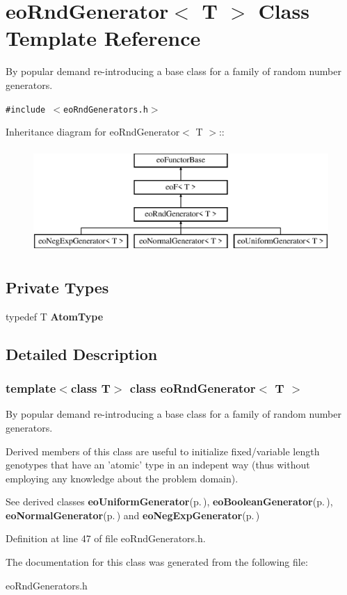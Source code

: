 \section{eo\-Rnd\-Generator$<$ T $>$ Class Template Reference}
\label{classeo_rnd_generator}
By popular demand re-introducing a base class for a family of random number generators.  


{\tt \#include $<$eo\-Rnd\-Generators.h$>$}

Inheritance diagram for eo\-Rnd\-Generator$<$ T $>$::\begin{figure}[H]
\begin{center}
\leavevmode
\includegraphics[height=4cm]{classeo_rnd_generator}
\end{center}
\end{figure}
\subsection*{Private Types}
\begin{CompactItemize}
\item 
typedef T {\bf Atom\-Type}\label{classeo_rnd_generator_y0}

\end{CompactItemize}


\subsection{Detailed Description}
\subsubsection*{template$<$class T$>$ class eo\-Rnd\-Generator$<$ T $>$}

By popular demand re-introducing a base class for a family of random number generators. 

Derived members of this class are useful to initialize fixed/variable length genotypes that have an 'atomic' type in an indepent way (thus without employing any knowledge about the problem domain).

See derived classes {\bf eo\-Uniform\-Generator}{\rm (p.\,\pageref{classeo_uniform_generator})}, {\bf eo\-Boolean\-Generator}{\rm (p.\,\pageref{classeo_boolean_generator})}, {\bf eo\-Normal\-Generator}{\rm (p.\,\pageref{classeo_normal_generator})} and {\bf eo\-Neg\-Exp\-Generator}{\rm (p.\,\pageref{classeo_neg_exp_generator})} 



Definition at line 47 of file eo\-Rnd\-Generators.h.

The documentation for this class was generated from the following file:\begin{CompactItemize}
\item 
eo\-Rnd\-Generators.h\end{CompactItemize}
